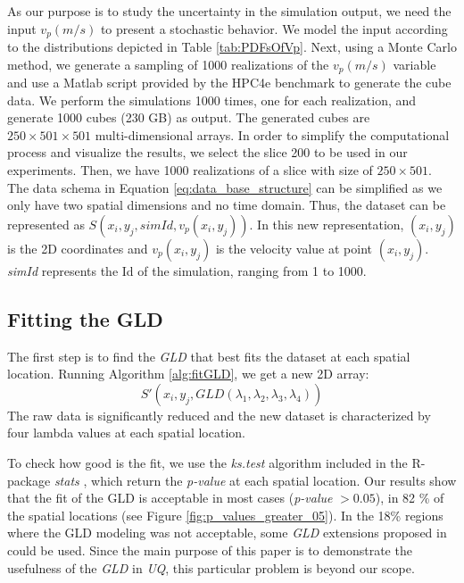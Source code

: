 \documentclass[11pt]{article}
\begin{document}
As our purpose is to study the uncertainty in the simulation output, we need the input $v_{p}(m/s)$ to present a stochastic behavior. We model the input according to the distributions depicted in Table \ref{tab:PDFsOfVp}. Next, using a Monte Carlo method, we generate a sampling of 1000 realizations of the $v_{p}(m/s)$ variable and use a Matlab script provided by the HPC4e benchmark to generate the cube data. We perform the simulations
1000 times, one for each  realization, and generate 1000 cubes (230 GB) as output. The generated cubes are $250\times501\times501$  multi-dimensional arrays. In order to simplify the computational process and visualize the results, we select the slice 200
to be used in our experiments.
Then, we have 1000 realizations of a slice with size of $250\times501$. The data schema in Equation \ref{eq:data_base_structure} can be simplified as we only have two spatial dimensions and no time domain. Thus, the dataset can be represented as $S(x_{i},y_{j},simId,v_{p}(x_{i},y_{j}))$. In this new representation, $(x_{i},y_{j})$ is the 2D coordinates and $v_{p}(x_{i},y_{j})$ is the velocity value at point $(x_{i},y_{j})$. \textit{simId} represents the Id of the simulation, ranging from 1 to 1000.


\subsection{Fitting the GLD}\label{ft_gld}
The first step is to find the \textit{GLD} that best fits the dataset at each spatial location. Running Algorithm \ref{alg:fitGLD}, we get a new 2D array:
\begin{equation}\label{eq:gld_fit_2D}
S'(x_{i},y_{j},GLD(\lambda_{1}, \lambda_{2}, \lambda_{3}, \lambda_{4}))
\end{equation}
The raw data is significantly reduced and the new dataset is characterized by four lambda values at each spatial location. 

To check how good is the fit, we use the \textit{ks.test} algorithm included in the R-package \textit{stats} \cite{Lopes2011}, which return the \textit{p-value} at each spatial location. Our results show that the fit of the GLD is acceptable in most cases (\textit{p-value} $>0.05$),
in 82 \% of the spatial locations (see Figure \ref{fig:p_values_greater_05}). In the 18\% regions where the GLD modeling was not acceptable, some \textit{GLD} extensions proposed in \cite{Karian2011} could be used. Since the main purpose of this paper is to demonstrate the usefulness of the \textit{GLD} in \textit{UQ}, this particular problem is beyond our scope.
\end{document}
